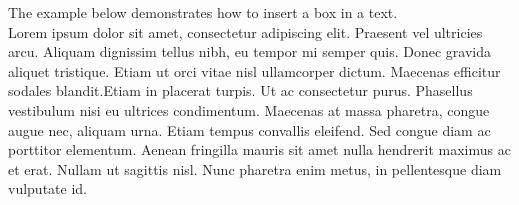 \documentclass{article}
\begin{document}
	
The example below demonstrates how to insert a box in a text. \\

Lorem ipsum dolor sit amet, consectetur adipiscing elit. Praesent vel ultricies arcu. Aliquam dignissim tellus nibh, eu tempor mi semper quis. Donec gravida aliquet tristique. Etiam ut orci vitae nisl ullamcorper dictum. Maecenas efficitur sodales blandit.Etiam in placerat turpis. Ut ac consectetur purus.
Phasellus vestibulum nisi eu ultrices condimentum. Maecenas at massa pharetra, congue augue nec, aliquam urna. Etiam tempus convallis eleifend. Sed congue diam ac porttitor elementum. Aenean fringilla mauris sit amet nulla hendrerit maximus ac et erat. Nullam ut sagittis nisl. Nunc pharetra enim metus, in pellentesque diam vulputate id.
\end{document}
